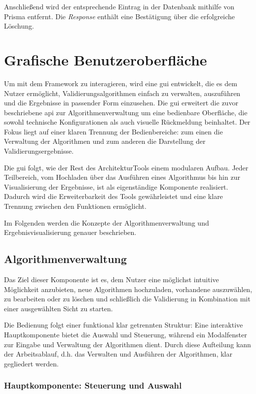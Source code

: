 Anschließend wird der entsprechende Eintrag in der Datenbank mithilfe von Prisma entfernt. Die \textit{Response} enthält eine Bestätigung über die erfolgreiche Löschung.

\section{Grafische Benutzeroberfläche}
\label{sec:gui}


Um mit dem Framework zu interagieren, wird eine \gls{gui} entwickelt, die es dem Nutzer ermöglicht, Validierungsalgorithmen einfach zu verwalten, auszuführen und die Ergebnisse in passender Form einzusehen. Die \gls{gui} erweitert die zuvor beschriebene \gls{api} zur Algorithmenverwaltung um eine bedienbare Oberfläche, die sowohl technische Konfigurationen als auch visuelle Rückmeldung beinhaltet. Der Fokus liegt auf einer klaren Trennung der Bedienbereiche: zum einen die Verwaltung der Algorithmen und zum anderen die Darstellung der Validierungsergebnisse.

Die \gls{gui} folgt, wie der Rest des ArchitekturTools einem modularen Aufbau. Jeder Teilbereich, vom Hochladen über das Ausführen eines Algorithmus bis hin zur Visualisierung der Ergebnisse, ist als eigenständige Komponente realisiert. Dadurch wird die Erweiterbarkeit des Tools gewährleistet und eine klare Trennung zwischen den Funktionen ermöglicht.

Im Folgenden werden die Konzepte der Algorithmenverwaltung und Ergebnisvisualisierung genauer beschrieben.

\subsection{Algorithmenverwaltung}
\label{subsec:gui_verwaltung}

Das Ziel dieser Komponente ist es, dem Nutzer eine möglichst intuitive Möglichkeit anzubieten, neue Algorithmen hochzuladen, vorhandene auszuwählen, zu bearbeiten oder zu löschen und schließlich die Validierung in Kombination mit einer ausgewählten Sicht zu starten.

Die Bedienung folgt einer funktional klar getrennten Struktur: Eine interaktive Hauptkomponente bietet die Auswahl und Steuerung, während ein Modalfenster zur Eingabe und Verwaltung der Algorithmen dient. Durch diese Aufteilung kann der Arbeitsablauf, d.h. das Verwalten und Ausführen der Algorithmen, klar gegliedert werden.

\subsubsection*{Hauptkomponente: Steuerung und Auswahl}

